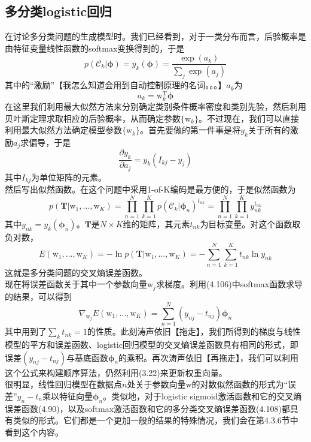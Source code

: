 \documentclass[b5paper]{book}
\numberwithin{equation}{chapter}
\newcommand {\bw} {\boldsymbol{\mathrm{w}}}
\newcommand {\rmT} {\mathrm{T}}
\newcommand {\bfphi} {\boldsymbol{\phi}}
\newcommand {\calC} {\mathcal{C}}
\begin{document}
	\subsection{多分类logistic回归}
	\textnormal{在讨论多分类问题的生成模型时。我们已经看到，对于一类分布而言，后验概率是由特征变量线性函数的softmax变换得到的，于是
	\begin{equation}
		p(\calC_k | \bfphi) = y_k(\bfphi) = \frac{\exp (a_k)}{\sum_j \exp (a_j)}
	\end{equation}
	其中的“激励”【我怎么知道会用到自动控制原理的名词。。。】$a_k$为
	\begin{equation}
		a_k = \bw^{\rmT}_k \bfphi
	\end{equation}
	在这里我们利用最大似然方法来分别确定类别条件概率密度和类别先验，然后利用贝叶斯定理求取相应的后验概率，从而确定参数$\{\bw_k\}$。不过现在，我们可以直接利用最大似然方法确定模型参数$\{\bw_k\}$。首先要做的第一件事是将$y_k$关于所有的激励$a_j$求偏导，于是
	\begin{equation}
		\frac{\partial y_k}{\partial a_j} = y_k (I_{kj} - y_j)
	\end{equation}
	其中$I_{kj}$为单位矩阵的元素。\\
	\indent 然后写出似然函数。在这个问题中采用1-of-K编码是最方便的，于是似然函数为
	\begin{equation}
		p(\mathbf{T}|\bw_1, ..., \bw_K) = \prod_{n=1}^N \prod_{k=1}^K p(\calC_k|\bfphi_n)^{t_{nk}} = \prod_{n=1}^N \prod_{k=1}^K y_{nk}^{t_{nk}}
	\end{equation}
	其中$y_{nk} = y_k(\bfphi_n)$。$\mathbf{T}$是$N \times K$维的矩阵，其元素$t_{nk}$为目标变量。对这个函数取负对数，
	\begin{equation}
		E(\bw_1, ..., \bw_K) = -\ln p(\mathbf{T}|\bw_1, ..., \bw_K) = -\sum_{n=1}^N \sum_{k=1}^K t_{nk} \ln y_{nk}
	\end{equation}
	这就是多分类问题的交叉熵误差函数。\\
	\indent 现在将误差函数关于其中一个参数向量$\bw_j$求梯度。利用(4.106)中softmax函数求导的结果，可以得到
	\begin{equation}
		\nabla_{\bw_j}E(\bw_1, ..., \bw_K) = \sum_{n=1}^N (y_{nj} - t_{nj})\bfphi_n
	\end{equation}
	其中用到了$\sum_k t_{nk} = 1$的性质。此刻涛声依旧【拖走】，我们所得到的梯度与线性模型的平方和误差函数、logistic回归模型的交叉熵误差函数具有相同的形式，即误差$(y_{nj} - t_{nj})$与基底函数$\bfphi_n$的乘积。再次涛声依旧【再拖走】，我们可以利用这个公式来构建顺序算法，仍然利用(3.22)来更新权重向量。\\
	\indent 很明显，线性回归模型在数据点$n$处关于参数向量$\bw$的对数似然函数的形式为“误差”$y_n -t_n$乘以特征向量$\bfphi_n$。类似地，对于logistic sigmoid激活函数和它的交叉熵误差函数(4.90)，以及softmax激活函数和它的多分类交叉熵误差函数(4.108)都具有类似的形式。它们都是一个更加一般的结果的特殊情况，我们会在第4.3.6节中看到这个内容。\\
}
\end{document}
